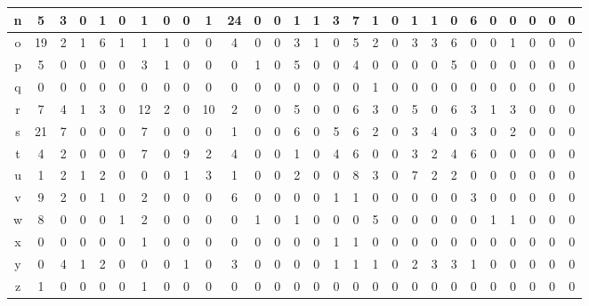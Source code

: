 {\begin{table*}[]
\begin{center}
\begin{tabular}{|c|c|c|c|c|c|c|c|c|c|c|c|c|c|c|c|c|c|c|c|c|c|c|c|c|c|c|c|}
n & 5 & 3 & 0 & 1 & 0 & 1 & 0 & 0 & 1 & 24 & 0 & 0 & 1 & 1 & 3 & 7 & 1 & 0 & 1 & 1 & 0 & 6 & 0 & 0 & 0 & 0 & 0 \\ \hline
o & 19 & 2 & 1 & 6 & 1 & 1 & 1 & 0 & 0 & 4 & 0 & 0 & 3 & 1 & 0 & 5 & 2 & 0 & 3 & 3 & 6 & 0 & 0 & 1 & 0 & 0 & 0 \\ \hline
p & 5 & 0 & 0 & 0 & 0 & 3 & 1 & 0 & 0 & 0 & 1 & 0 & 5 & 0 & 0 & 4 & 0 & 0 & 0 & 0 & 5 & 0 & 0 & 0 & 0 & 0 & 0 \\ \hline
q & 0 & 0 & 0 & 0 & 0 & 0 & 0 & 0 & 0 & 0 & 0 & 0 & 0 & 0 & 0 & 0 & 1 & 0 & 0 & 0 & 0 & 0 & 0 & 0 & 0 & 0 & 0 \\ \hline
r & 7 & 4 & 1 & 3 & 0 & 12 & 2 & 0 & 10 & 2 & 0 & 0 & 5 & 0 & 0 & 6 & 3 & 0 & 5 & 0 & 6 & 3 & 1 & 3 & 0 & 0 & 0 \\ \hline
s & 21 & 7 & 0 & 0 & 0 & 7 & 0 & 0 & 0 & 1 & 0 & 0 & 6 & 0 & 5 & 6 & 2 & 0 & 3 & 4 & 0 & 3 & 0 & 2 & 0 & 0 & 0 \\ \hline
t & 4 & 2 & 0 & 0 & 0 & 7 & 0 & 9 & 2 & 4 & 0 & 0 & 1 & 0 & 4 & 6 & 0 & 0 & 3 & 2 & 4 & 6 & 0 & 0 & 0 & 0 & 0 \\ \hline
u & 1 & 2 & 1 & 2 & 0 & 0 & 0 & 1 & 3 & 1 & 0 & 0 & 2 & 0 & 0 & 8 & 3 & 0 & 7 & 2 & 2 & 0 & 0 & 0 & 0 & 0 & 0 \\ \hline
v & 9 & 2 & 0 & 1 & 0 & 2 & 0 & 0 & 0 & 6 & 0 & 0 & 0 & 0 & 1 & 1 & 0 & 0 & 0 & 0 & 0 & 3 & 0 & 0 & 0 & 0 & 0 \\ \hline
w & 8 & 0 & 0 & 0 & 1 & 2 & 0 & 0 & 0 & 0 & 1 & 0 & 1 & 0 & 0 & 0 & 5 & 0 & 0 & 0 & 0 & 0 & 1 & 1 & 0 & 0 & 0 \\ \hline
x & 0 & 0 & 0 & 0 & 0 & 1 & 0 & 0 & 0 & 0 & 0 & 0 & 0 & 0 & 1 & 1 & 0 & 0 & 0 & 0 & 0 & 0 & 0 & 0 & 0 & 0 & 0 \\ \hline
y & 0 & 4 & 1 & 2 & 0 & 0 & 0 & 1 & 0 & 3 & 0 & 0 & 0 & 0 & 1 & 1 & 1 & 0 & 2 & 3 & 3 & 1 & 0 & 0 & 0 & 0 & 0 \\ \hline
z & 1 & 0 & 0 & 0 & 0 & 1 & 0 & 0 & 0 & 0 & 0 & 0 & 0 & 0 & 0 & 0 & 0 & 0 & 0 & 0 & 0 & 0 & 0 & 0 & 0 & 0 & 0 \\ \hline
   \end{tabular}
  \end{center}
 \end{table*}
}


